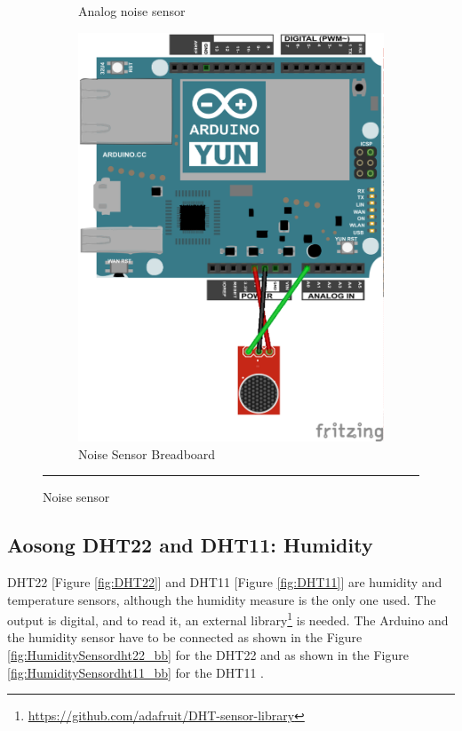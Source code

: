 \documentclass[12pt, a4paper,twoside]{tesi_upf}
\begin{document}
\begin{figure}
\begin{subfigure}[b]{0.3\textwidth}
                \caption{Analog noise sensor}
                \label{fig:Analognoisesensor}
        \end{subfigure}
        \begin{subfigure}[b]{0.3\textwidth}
                \includegraphics[width=\textwidth]{./Figures/Fritzing/NoiseSensor_bb.png}
                \caption{Noise Sensor Breadboard}
                \label{fig:NoiseSensor_bb}
        \end{subfigure}
        \rule{35em}{0.5pt}
        \caption{Noise sensor}\label{fig:noisesensor}
			\end{figure}


    \subsection{Aosong DHT22 and DHT11: Humidity}
      DHT22 [Figure \ref{fig:DHT22}] and DHT11 [Figure \ref{fig:DHT11}] are humidity and temperature sensors, although the humidity measure is the only one used. The output is digital, and to read it, an external library\footnote{\url{https://github.com/adafruit/DHT-sensor-library}} is needed. The Arduino and the humidity sensor have to be connected as shown in the Figure \ref{fig:HumiditySensordht22_bb} for the DHT22 and as shown in the Figure \ref{fig:HumiditySensordht11_bb} for the DHT11 \cite{dht22sensor}.
      
\end{document}
